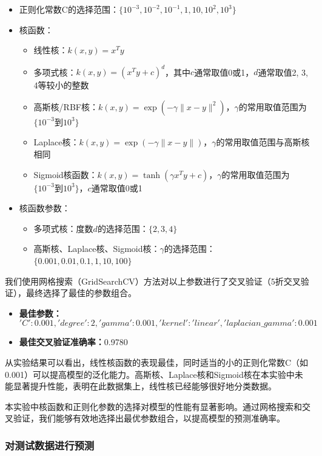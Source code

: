\documentclass[12pt]{article}
\begin{document}
\begin{itemize}
  \item 正则化常数C的选择范围：\(\{10^{-3}, 10^{-2}, 10^{-1}, 1, 10, 10^2, 10^3\}\)
  \item 核函数：
        \begin{itemize}
          \item 线性核：\(k(x,y) = x^T y\)
          \item 多项式核：\(k(x,y) = (x^T y + c)^d\)，其中\(c\)通常取值0或1，\(d\)通常取值2, 3, 4等较小的整数
          \item 高斯核/RBF核：\(k(x,y) = \exp(-\gamma \|x - y\|^2)\)，\(\gamma\)的常用取值范围为\(\{10^{-3}到10^3\}\)
          \item Laplace核：\(k(x,y) = \exp(-\gamma \|x - y\|)\)，\(\gamma\)的常用取值范围与高斯核相同
          \item Sigmoid核函数：\(k(x,y) = \tanh(\gamma x^T y + c)\)，\(\gamma\)的常用取值范围为\(\{10^{-3}到10^3\}\)，\(c\)通常取值0或1
        \end{itemize}
  \item 核函数参数：
        \begin{itemize}
          \item 多项式核：度数\(d\)的选择范围：\(\{2, 3, 4\}\)
          \item 高斯核、Laplace核、Sigmoid核：\(\gamma\)的选择范围：\(\{0.001, 0.01, 0.1, 1, 10, 100\}\)
        \end{itemize}
\end{itemize}

我们使用网格搜索（GridSearchCV）方法对以上参数进行了交叉验证（5折交叉验证），最终选择了最佳的参数组合。

\begin{itemize}
  \item \textbf{最佳参数：}\['C': 0.001, 'degree': 2, 'gamma': 0.001, 'kernel': 'linear', 'laplacian\_gamma': 0.001\]
  \item \textbf{最佳交叉验证准确率：}0.9780
\end{itemize}

从实验结果可以看出，线性核函数的表现最佳，同时适当的小的正则化常数C（如0.001）可以提高模型的泛化能力。高斯核、Laplace核和Sigmoid核在本实验中未能显著提升性能，表明在此数据集上，线性核已经能够很好地分类数据。

本实验中核函数和正则化参数的选择对模型的性能有显著影响。通过网格搜索和交叉验证，我们能够有效地选择出最优参数组合，以提高模型的预测准确率。
\subsubsection{对测试数据进行预测}
\end{document}
